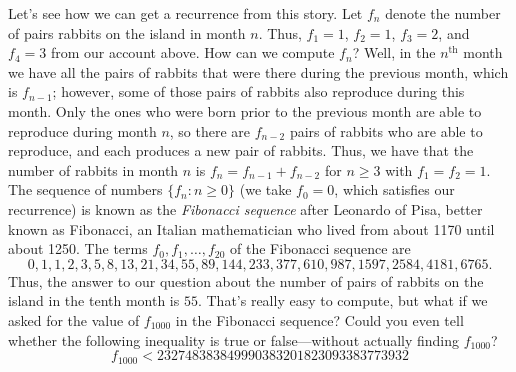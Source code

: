 Let's see how we can get a recurrence from this story. Let $f_n$
denote the number of pairs rabbits on the island in month $n$. Thus,
$f_1 = 1$, $f_2 = 1$, $f_3=2$, and $f_4=3$ from our account above. How
can we compute $f_n$? Well, in the $n^\text{th}$ month we have all the
pairs of rabbits that were there during the previous month, which is
$f_{n-1}$; however, some of those pairs of rabbits also reproduce
during this month. Only the ones who were born prior to the previous
month are able to reproduce during month $n$, so there are $f_{n-2}$
pairs of rabbits who are able to reproduce, and each produces a new
pair of rabbits. Thus, we have that the number of rabbits in month $n$
is $f_n = f_{n-1} + f_{n-2}$ for $n\geq 3$ with $f_1=f_2=1$. The
sequence of numbers $\{f_n\colon n\geq 0\}$ (we take $f_0=0$, which
satisfies our recurrence) is known as the \emph{Fibonacci sequence}
after Leonardo of Pisa, better known as Fibonacci, an Italian
mathematician who lived from about 1170 until about 1250. The terms
$f_0,f_1,\dots,f_{20}$ of the Fibonacci sequence are
\[
0,1,1,2,3,5,8,13,21,34,55,89,144,233,377,610,987, 1597,2584,4181,6765.
\]
Thus, the answer to our question about the number of pairs of rabbits
on the island in the tenth month is $55$. That's really easy to
compute, but what if we asked for the value of $f_{1000}$ in the
Fibonacci sequence? Could you even tell whether the following
inequality is true or false---without actually finding $f_{1000}$?
\[
f_{1000} < 232748383849990383201823093383773932
\]


